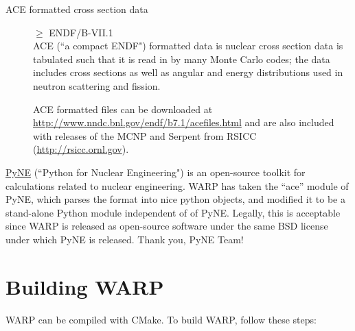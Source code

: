 \documentclass[twoside,a4paper]{refart}
\begin{document}
\begin{description}
\item[ACE formatted cross section data]
$\ge$ ENDF/B-VII.1 \\
ACE (``a compact ENDF") formatted data is nuclear cross section data is tabulated such that it is read in 
by many Monte Carlo codes; the data includes cross sections as well as angular and energy distributions 
used in neutron scattering and fission.

ACE formatted files can be downloaded at \url{http://www.nndc.bnl.gov/endf/b7.1/acefiles.html} and are 
also included with releases of the MCNP and Serpent from RSICC (\url{http://rsicc.ornl.gov}).

\end{description}

\href{http://pyne.io/}{PyNE} (``Python for Nuclear Engineering") is an open-source toolkit for calculations related to nuclear engineering.  WARP has taken the ``ace'' module of PyNE, which parses the format into nice python objects, and modified it to be a stand-alone Python module independent of of PyNE.  Legally, this is acceptable since WARP is released as open-source software under the same BSD license under which PyNE is released.  Thank you, PyNE Team!

\section{Building WARP}

WARP can be compiled with CMake. To build WARP, follow these steps:
\end{document}
